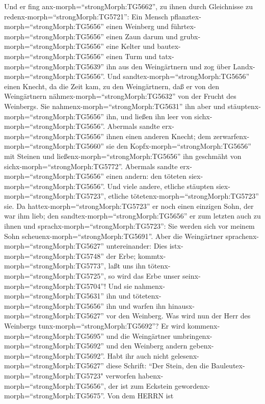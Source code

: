  Und er fing anx-morph=``strongMorph:TG5662'', zu ihnen
durch Gleichnisse zu redenx-morph=``strongMorph:TG5721'': Ein Mensch
pflanztex-morph=``strongMorph:TG5656'' einen Weinberg und
führtex-morph=``strongMorph:TG5656'' einen Zaun darum und
grubx-morph=``strongMorph:TG5656'' eine Kelter und
bautex-morph=``strongMorph:TG5656'' einen Turm und
tatx-morph=``strongMorph:TG5639'' ihn aus den Weingärtnern und zog über
Landx-morph=``strongMorph:TG5656''.  Und
sandtex-morph=``strongMorph:TG5656'' einen Knecht, da die Zeit kam, zu
den Weingärtnern, daß er von den Weingärtnern
nähmex-morph=``strongMorph:TG5632'' von der Frucht des Weinbergs.
 Sie nahmenx-morph=``strongMorph:TG5631'' ihn aber und
stäuptenx-morph=``strongMorph:TG5656'' ihn, und ließen ihn leer von
sichx-morph=``strongMorph:TG5656''.  Abermals sandte
erx-morph=``strongMorph:TG5656'' ihnen einen anderen Knecht; dem
zerwarfenx-morph=``strongMorph:TG5660'' sie den
Kopfx-morph=``strongMorph:TG5656'' mit Steinen und
ließenx-morph=``strongMorph:TG5656'' ihn geschmäht von
sichx-morph=``strongMorph:TG5772''.  Abermals sandte
erx-morph=``strongMorph:TG5656'' einen andern: den töteten
siex-morph=``strongMorph:TG5656''. Und viele andere, etliche stäupten
siex-morph=``strongMorph:TG5723'', etliche
tötetenx-morph=``strongMorph:TG5723'' sie.  Da
hattex-morph=``strongMorph:TG5723'' er noch einen einzigen Sohn, der war
ihm lieb; den sandtex-morph=``strongMorph:TG5656'' er zum letzten auch
zu ihnen und sprachx-morph=``strongMorph:TG5723'': Sie werden sich vor
meinem Sohn scheuenx-morph=``strongMorph:TG5691''.  Aber die
Weingärtner sprachenx-morph=``strongMorph:TG5627'' untereinander: Dies
istx-morph=``strongMorph:TG5748'' der Erbe;
kommtx-morph=``strongMorph:TG5773'', laßt uns ihn
tötenx-morph=``strongMorph:TG5725'', so wird das Erbe unser
seinx-morph=``strongMorph:TG5704''!  Und sie
nahmenx-morph=``strongMorph:TG5631'' ihn und
tötetenx-morph=``strongMorph:TG5656'' ihn und warfen ihn
hinausx-morph=``strongMorph:TG5627'' vor den Weinberg.  Was
wird nun der Herr des Weinbergs tunx-morph=``strongMorph:TG5692''? Er
wird kommenx-morph=``strongMorph:TG5695'' und die Weingärtner
umbringenx-morph=``strongMorph:TG5692'' und den Weinberg andern
gebenx-morph=``strongMorph:TG5692''.  Habt ihr auch nicht
gelesenx-morph=``strongMorph:TG5627'' diese Schrift: ``Der Stein, den
die Bauleutex-morph=''strongMorph:TG5723" verworfen
habenx-morph=``strongMorph:TG5656'', der ist zum Eckstein
gewordenx-morph=``strongMorph:TG5675''.  Von dem HERRN ist
